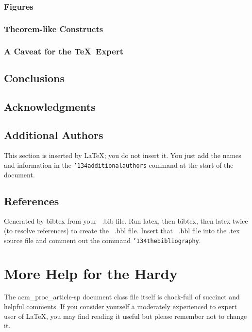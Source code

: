 \documentclass{acm_proc_article-sp}
\begin{document}
\subsubsection{Figures}
\subsubsection{Theorem-like Constructs}
\subsubsection*{A Caveat for the \TeX\ Expert}
\subsection{Conclusions}
\subsection{Acknowledgments}
\subsection{Additional Authors}
This section is inserted by \LaTeX; you do not insert it.
You just add the names and information in the
\texttt{{\char'134}additionalauthors} command at the start
of the document.
\subsection{References}
Generated by bibtex from your ~.bib file.  Run latex,
then bibtex, then latex twice (to resolve references)
to create the ~.bbl file.  Insert that ~.bbl file into
the .tex source file and comment out
the command \texttt{{\char'134}thebibliography}.
\section{More Help for the Hardy}
The acm\_proc\_article-sp document class file itself is chock-full of succinct
and helpful comments.  If you consider yourself a moderately
experienced to expert user of \LaTeX, you may find reading
it useful but please remember not to change it.
\balancecolumns
\end{document}
